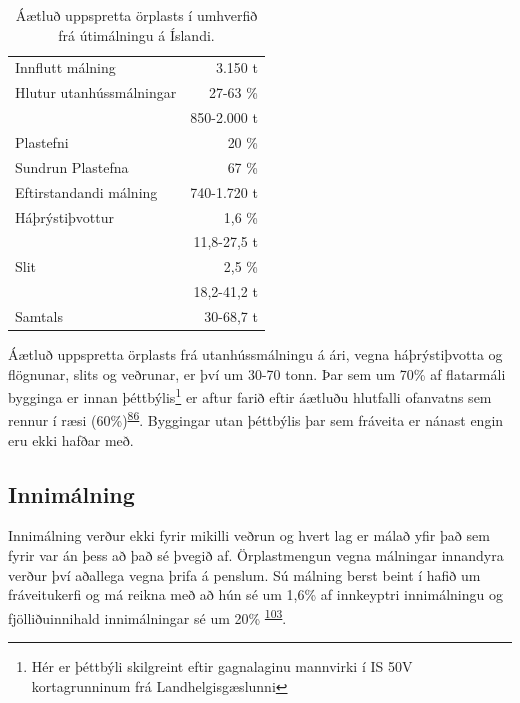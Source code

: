 \documentclass[icelandic,]{book}
\let\rmarkdownfootnote\footnote%
\def\footnote{\protect\rmarkdownfootnote}
\begin{document}
\begin{table}[t]

\caption{\label{tab:malningartafla}Áætluð uppspretta örplasts í umhverfið frá útimálningu á Íslandi.}
\centering
\begin{tabular}{lr}
\toprule
Innflutt málning & 3.150 t\\
\addlinespace
\rowcolor{gray!6}  Hlutur utanhússmálningar & 27-63 \%\\
\rowcolor{gray!6}   & 850-2.000 t\\
\addlinespace
Plastefni & 20 \%\\
Sundrun Plastefna & 67 \%\\
\addlinespace
\rowcolor{gray!6} Eftirstandandi málning & 740-1.720 t\\
\addlinespace
Háþrýstiþvottur & 1,6 \%\\
 & 11,8-27,5 t\\
\rowcolor{gray!6} Slit & 2,5 \%\\
\rowcolor{gray!6}  & 18,2-41,2 t\\
 \addlinespace
Samtals & 30-68,7 t \\
\bottomrule
\end{tabular}
\end{table}

Áætluð uppspretta örplasts frá utanhússmálningu á ári, vegna háþrýstiþvotta og flögnunar, slits og veðrunar, er því um 30-70 tonn. Þar sem um 70\% af flatarmáli bygginga er innan þéttbýlis\footnote{Hér er þéttbýli skilgreint eftir gagnalaginu mannvirki í IS 50V kortagrunninum frá Landhelgisgæslunni} er aftur farið eftir áætluðu hlutfalli ofanvatns sem rennur í ræsi (60\%)\textsuperscript{\protect\hyperlink{ref-Verschoor2016}{86}}. Byggingar utan þéttbýlis þar sem fráveita er nánast engin eru ekki hafðar með. 


\hypertarget{innimalning}{%
\subsection*{Innimálning}\label{innimalning}}

Innimálning verður ekki fyrir mikilli veðrun og hvert lag er málað yfir það sem fyrir var án þess að það sé þvegið af. Örplastmengun vegna málningar innandyra verður því aðallega vegna þrifa á penslum. Sú málning berst beint í hafið um fráveitukerfi og má reikna með að hún sé um 1,6\% af innkeyptri innimálningu og fjölliðuinnihald innimálningar sé um 20\% \textsuperscript{\protect\hyperlink{ref-Hann2018}{103}}.
\end{document}
